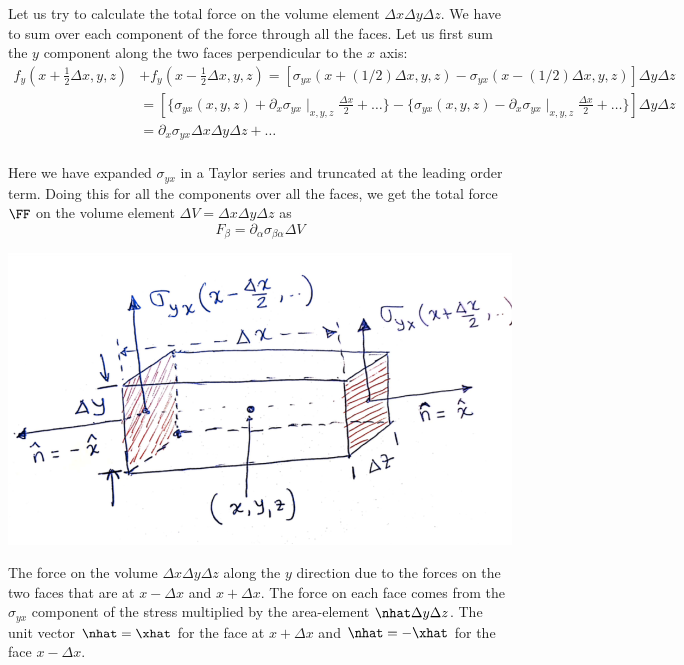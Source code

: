 \documentclass{tufte-book} %
\begin{document}
\begin{fullwidth}
Let us try to calculate the total
force on the volume element $\Delta x\Delta y\Delta z$. 
We have to sum over each component of the
force through all the faces. Let us first sum the  $y$ component along
the two faces perpendicular to the $x$ axis:
\begin{subequations}
\begin{align}
f_y(x+\frac{1}{2}\Delta x,y,z)&+f_y(x-\frac{1}{2}\Delta x,y,z) 
= \left[ \sigma_{yx}(x+(1/2)\Delta x,y,z)-  \sigma_{yx}(x-(1/2)\Delta
  x,y,z) \right] \Delta y\Delta z \nonumber \\
&=\left[ \{\sigma_{yx}(x,y,z) + \partial_x \sigma_{yx}\mid_{x,y,z}\frac{\Delta x}{2} +\ldots\}
            -  \{\sigma_{yx}(x,y,z) - \partial_x
  \sigma_{yx}\mid_{x,y,z}\frac{\Delta x}{2}+ \ldots\}  \right]\Delta y \Delta z
  \nonumber \\
&= \partial_x \sigma_{yx} \Delta x\Delta y\Delta z + \ldots \nonumber \\
\end{align}
\end{subequations} 
\end{fullwidth}
Here we have expanded $\sigma_{yx}$ in a Taylor series and truncated
at the leading order term.  Doing this for all the components over all
the faces, we get the total force $\FF$ on the volume element 
$\Delta V = \Delta x\Delta y\Delta z$ as 
\begin{equation}
F_{\beta} = \partial_{\alpha}\sigma_{\beta\alpha}\Delta V 
\label{eq:divs}
\end{equation}
%
 \begin{marginfigure}
  \includegraphics{figures/DivStress.png}
 \caption{ The force on the volume $\Delta x\Delta y\Delta z$ along
   the $y$ direction due to the forces on the two faces that are at
   $x-\Delta x$ and $x+\Delta x$. The force on each face comes from the
   $\sigma_{yx}$  component of the stress multiplied by the 
   area-element  $\nhat\Delta y\Delta z$. The unit vector $\nhat =
   \xhat$ for the face at $x+\Delta x$ and $\nhat=-\xhat$ for the face
 $x-\Delta x$. }
  \label{fig:DivStress}
\end{marginfigure}
\end{document}
